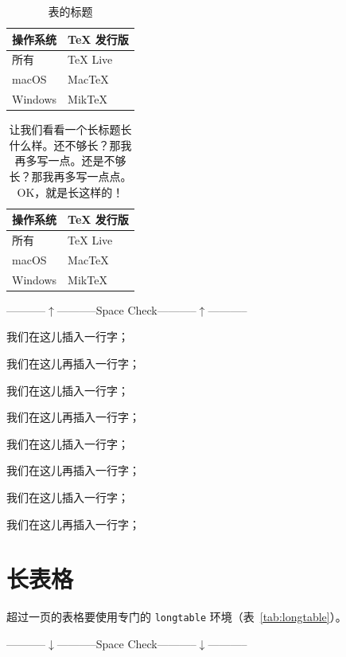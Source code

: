 \begin{table}[!h]
  \centering
  \caption{表的标题}
  \label{tab:exampletable}
  \begin{tabular}{p{4cm}p{4cm}}
    \toprule
    \multicolumn{1}{c}{\textbf{操作系统}} & \multicolumn{1}{c}{\textbf{TeX 发行版}} \\
    \midrule
    所有 & TeX Live \\
    macOS & MacTeX \\
    Windows & MikTeX \\
    \bottomrule
  \end{tabular}
\end{table}

\begin{table}[!h]
  \centering
  \caption{让我们看看一个长标题长什么样。还不够长？那我再多写一点。还是不够长？那我再多写一点点。OK，就是长这样的！}
  \label{tab:exampletable}
  \begin{tabular}{p{4cm}p{4cm}}
    \toprule
    \multicolumn{1}{c}{\textbf{操作系统}} & \multicolumn{1}{c}{\textbf{TeX 发行版}} \\
    \midrule
    所有 & TeX Live \\
    macOS & MacTeX \\
    Windows & MikTeX \\
    \bottomrule
  \end{tabular}
\end{table}

\centerline{-----------$\uparrow$-----------Space Check-----------$\uparrow$-----------}

我们在这儿插入一行字；

我们在这儿再插入一行字；

我们在这儿插入一行字；

我们在这儿再插入一行字；

我们在这儿插入一行字；

我们在这儿再插入一行字；

我们在这儿插入一行字；

我们在这儿再插入一行字；

\section{长表格}

超过一页的表格要使用专门的 \texttt{longtable} 环境（表~\ref{tab:longtable}）。\\
\centerline{-----------$\downarrow$-----------Space Check-----------$\downarrow$-----------}


